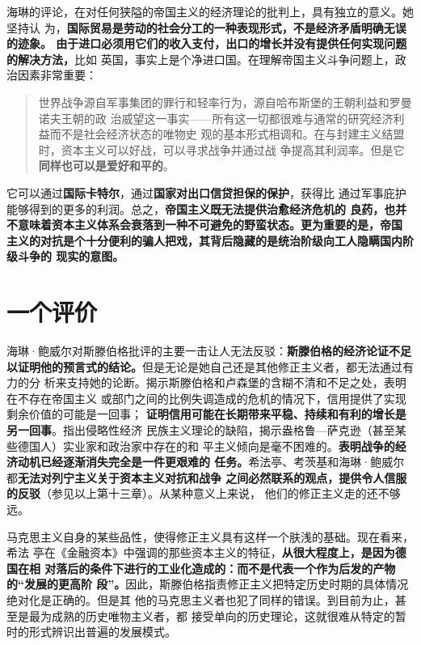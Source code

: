 海琳的评论，在对任何狭隘的帝国主义的经济理论的批判上，具有独立的意义。她坚持认
为，\textbf{国际贸易是劳动的社会分工的一种表现形式，不是经济矛盾明确无误的迹象。
  由于进口必须用它们的收入支付，出口的增长并没有提供任何实现问题的解决方法，}比如
英国，事实上是个净进口国。在理解帝国主义斗争问题上，政治因素非常重要：
\begin{quotation}
  世界战争源自军事集团的罪行和轻率行为，源自哈布斯堡的王朝利益和罗曼诺夫王朝的政
  治威望这一事实——所有这一切都很难与通常的研究经济利益而不是社会经济状态的唯物史
  观的基本形式相调和。在与封建主义结盟时，资本主义可以好战，可以寻求战争并通过战
  争提高其利润率。但是它\textbf{同样也可以是爱好和平的}。
\end{quotation}

它可以通过\textbf{国际卡特尔}，通过\textbf{国家对出口信贷担保的保护}，获得比
通过军事庇护能够得到的更多的利润。总之，\textbf{帝国主义既无法提供治愈经济危机的
良药，也并不意味着资本主义体系会衰落到一种不可避免的野蛮状态。更为重要的是，帝国
主义的对抗是个十分便利的骗人把戏，其背后隐藏的是统治阶级向工人隐瞒国内阶级斗争的
现实的意图。}
\vfill

\section{一个评价}

海琳·鲍威尔对斯滕伯格批评的主要一击让人无法反驳：\textbf{斯滕伯格的经济论证不足
以证明他的预言式的结论。}但是无论是她自己还是其他修正主义者，都无法通过有力的分
析来支持她的论断。揭示斯滕伯格和卢森堡的含糊不清和不足之处，表明在不存在帝国主义
或部门之间的比例失调造成的危机的情况下，信用提供了实现剩余价值的可能是一回事；
\textbf{证明信用可能在长期带来平稳、持续和有利的增长是另一回事}。指出侵略性经济
民族主义理论的缺陷，揭示盎格鲁—萨克逊（甚至某些德国人）实业家和政治家中存在的和
平主义倾向是毫不困难的。\textbf{表明战争的经济动机已经逐渐消失完全是一件更艰难的
任务。}希法亭、考茨基和海琳·鲍威尔都\textbf{无法对列宁主义关于资本主义对抗和战争
之间必然联系的观点，提供令人信服的反驳}（参见以上第十三章）。从某种意义上来说，
他们的修正主义走的还不够远。

马克思主义自身的某些品性，使得修正主义具有这样一个肤浅的基础。现在看来，希法
亭在《金融资本》中强调的那些资本主义的特征，\textbf{从很大程度上，是因为德国在相
对落后的条件下进行的工业化造成的：而不是代表一个作为后发的产物的“发展的更高阶
段”。}因此，斯滕伯格指责修正主义把特定历史时期的具体情况绝对化是正确的。但是其
他的马克思主义者也犯了同样的错误。到目前为止，甚至是最为成熟的历史唯物主义者，都
接受单向的历史理论，这就很难从特定的暂时的形式辨识出普遍的发展模式。

